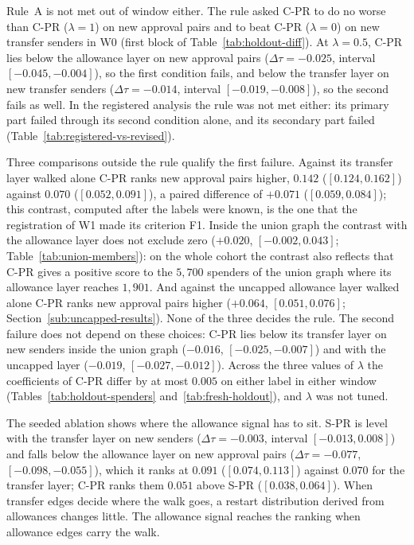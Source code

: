 
Rule~A is not met out of window either. The rule asked \mbox{C-PR} to do no worse than \mbox{C-PR} ($\lambda=1$) on new approval pairs and to beat \mbox{C-PR} ($\lambda=0$) on new transfer senders in W0 (first block of Table~\ref{tab:holdout-diff}). At $\lambda=0.5$, \mbox{C-PR} lies below the allowance layer on new approval pairs ($\Delta\tau=-0.025$, interval $[-0.045,-0.004]$), so the first condition fails, and below the transfer layer on new transfer senders ($\Delta\tau=-0.014$, interval $[-0.019,-0.008]$), so the second fails as well. In the registered analysis the rule was not met either: its primary part failed through its second condition alone, and its secondary part failed (Table~\ref{tab:registered-vs-revised}).

Three comparisons outside the rule qualify the first failure. Against its transfer layer walked alone \mbox{C-PR} ranks new approval pairs higher, $0.142$ ($[0.124,0.162]$) against $0.070$ ($[0.052,0.091]$), a paired difference of $+0.071$ ($[0.059,0.084]$); this contrast, computed after the labels were known, is the one that the registration of W1 made its criterion F1. Inside the union graph the contrast with the allowance layer does not exclude zero ($+0.020$, $[-0.002,0.043]$; Table~\ref{tab:union-members}): on the whole cohort the contrast also reflects that \mbox{C-PR} gives a positive score to the $5{,}700$ spenders of the union graph where its allowance layer reaches $1{,}901$. And against the uncapped allowance layer walked alone \mbox{C-PR} ranks new approval pairs higher ($+0.064$, $[0.051,0.076]$; Section~\ref{sub:uncapped-results}). None of the three decides the rule. The second failure does not depend on these choices: \mbox{C-PR} lies below its transfer layer on new senders inside the union graph ($-0.016$, $[-0.025,-0.007]$) and with the uncapped layer ($-0.019$, $[-0.027,-0.012]$). Across the three values of $\lambda$ the coefficients of \mbox{C-PR} differ by at most $0.005$ on either label in either window (Tables~\ref{tab:holdout-spenders} and~\ref{tab:fresh-holdout}), and $\lambda$ was not tuned.

The seeded ablation shows where the allowance signal has to sit. \mbox{S-PR} is level with the transfer layer on new senders ($\Delta\tau=-0.003$, interval $[-0.013,0.008]$) and falls below the allowance layer on new approval pairs ($\Delta\tau=-0.077$, $[-0.098,-0.055]$), which it ranks at $0.091$ ($[0.074,0.113]$) against $0.070$ for the transfer layer; \mbox{C-PR} ranks them $0.051$ above \mbox{S-PR} ($[0.038,0.064]$). When transfer edges decide where the walk goes, a restart distribution derived from allowances changes little. The allowance signal reaches the ranking when allowance edges carry the walk.

